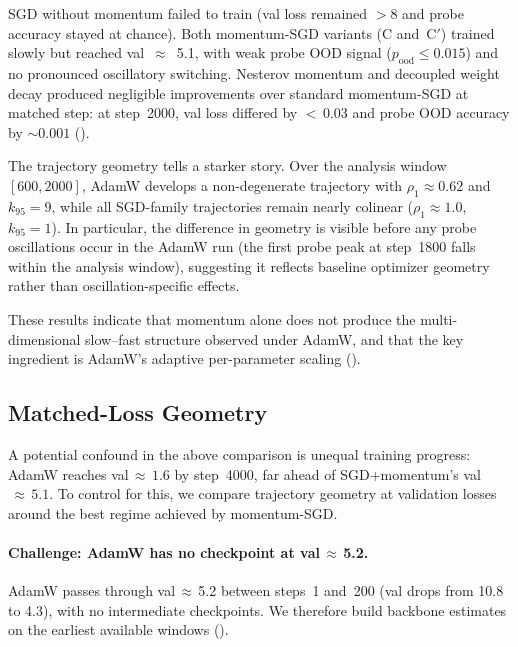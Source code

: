 \documentclass[11pt,a4paper]{article}
\begin{document}
SGD without momentum failed to train (val loss remained $>8$ and probe
accuracy stayed at chance).  Both momentum-SGD variants (C and~C$'$) trained
slowly but reached val~$\approx$~5.1, with weak probe OOD signal
($p_{\mathrm{ood}} \le 0.015$) and no pronounced oscillatory switching.
Nesterov momentum and decoupled weight decay produced negligible improvements
over standard momentum-SGD at matched step: at step~2000, val loss differed by
${<}\,0.03$ and probe OOD accuracy by ${\sim}0.001$
().

The trajectory geometry tells a starker story.  Over the analysis window
$[600, 2000]$, AdamW develops a non-degenerate trajectory with
$\rho_1 \approx 0.62$ and $k_{95} = 9$, while all SGD-family trajectories
remain nearly colinear ($\rho_1 \approx 1.0$, $k_{95} = 1$).  In particular,
the difference in geometry is visible before any probe oscillations occur in the
AdamW run (the first probe peak at step~1800 falls within the analysis
window), suggesting it reflects baseline optimizer geometry rather than
oscillation-specific effects.

These results indicate that momentum alone does not produce the multi-dimensional
slow--fast structure observed under AdamW, and that the key ingredient is
AdamW's adaptive per-parameter scaling ().

\subsection{Matched-Loss Geometry}\label{sec:matched-loss}

A potential confound in the above comparison is unequal training progress:
AdamW reaches val$\,\approx\,1.6$ by step~4000, far ahead of SGD+momentum's
val$\,\approx\,5.1$.  To control for this, we compare trajectory geometry at
validation losses around the best regime achieved by momentum-SGD.

\paragraph{Challenge: AdamW has no checkpoint at val$\,\approx\,$5.2.}
AdamW passes through val$\,\approx\,$5.2 between steps~1 and~200 (val drops
from 10.8 to 4.3), with no intermediate checkpoints.  We therefore build
backbone estimates on the earliest available windows
().
\end{document}
